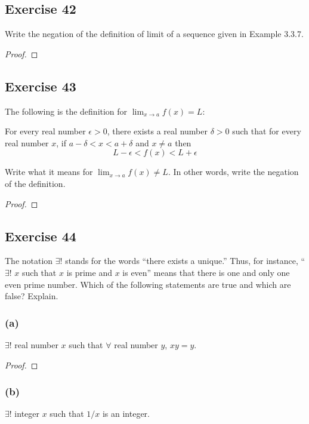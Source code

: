 \documentclass[14pt]{extarticle}
\newcommand{\fa}{\forall}
\newcommand{\te}{\exists}
\begin{document}
\subsection{Exercise 42}
Write the negation of the definition of limit of a sequence given in Example 3.3.7.

\begin{proof}

\end{proof}

\subsection{Exercise 43}
The following is the definition for $\lim_{x \to a} f(x) = L$:

For every real number $\epsilon > 0$, there exists a real number $\delta > 0$ such that for every real number $x$, if $a - \delta < x < a + \delta$ and $x \neq a$ then 
$$
L - \epsilon < f(x) < L + \epsilon
$$

Write what it means for $\lim_{x \to a} f(x) \neq L$. In other words, write the negation of the definition.

\begin{proof}

\end{proof}

\subsection{Exercise 44}
The notation $\te$! stands for the words “there exists a unique.” Thus, for instance, “$\te$! $x$ such that $x$ is prime and $x$ is even” means that there is one and only one even prime number. Which of the following statements are true and which are false? Explain.

\subsubsection{(a)}
$\te$! real number $x$ such that $\fa$ real number $y$, $xy = y$.

\begin{proof}

\end{proof}

\subsubsection{(b)}
$\te$! integer $x$ such that $1/x$ is an integer.
\end{document}
